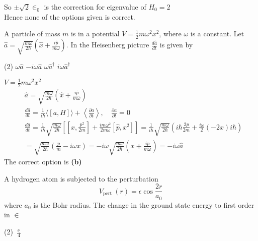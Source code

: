 \begin{enumerate}
\begin{answer}
	So $\pm \sqrt{2} \in_{0}$ is the correction for eigenvalue of $H_{0}=2$\\
	Hence none of the options given is correct.	
\end{answer}
\begin{minipage}{\textwidth}
	\item A particle of mass $m$ is in a potential $V=\frac{1}{2} m \omega^{2} x^{2}$, where $\omega$ is a constant. Let $\hat{a}=\sqrt{\frac{m \omega}{2 \hbar}}\left(\hat{x}+\frac{i \hat{p}}{m \omega}\right) .$ In the Heisenberg picture $\frac{d \hat{a}}{d t}$ is given by
\end{minipage}
\begin{tasks}(2)
	\task[\textbf{A.}] $\omega \hat{a}$
	\task[\textbf{B.}]$-i \omega \hat{a}$
	\task[\textbf{C.}]$\omega \hat{a}^{\dagger}$
	\task[\textbf{D.}]$i \omega \hat{a}^{\dagger}$
\end{tasks}
\begin{answer}
	$V=\frac{1}{2} m \omega^{2} x^{2}$\\
	$$\begin{aligned}
	&\hat{a}=\sqrt{\frac{m \omega}{2 \hbar}}\left(\hat{x}+\frac{i \hat{p}}{m \omega}\right) \\
	&\frac{d \hat{a}}{d t}=\frac{1}{i \hbar}\langle[a, H]\rangle+\left\langle\frac{\partial a}{\partial t}\right\rangle, \quad \frac{\partial a}{\partial t}=0 \\
	&\frac{d \hat{a}}{d t}=\frac{1}{i \hbar} \sqrt{\frac{m \omega}{2 \hbar}}\left[\left[x, \frac{p^{2}}{2 m}\right]+\frac{i m \omega^{2}}{2 m \omega}\left[\hat{p}, x^{2}\right]\right]=\frac{1}{i \hbar} \sqrt{\frac{m \omega}{2 \hbar}}\left(i \hbar \frac{2 p}{2 m}+\frac{i \omega}{2}(-2 x) i \hbar\right) \\
	&=\sqrt{\frac{m \omega}{2 \hbar}}\left(\frac{p}{m}-i \omega x\right)=-i \omega \sqrt{\frac{m \omega}{2 \hbar}}\left(x+\frac{i p}{m \omega}\right)=-i \omega \hat{a}
	\end{aligned}$$
	The correct option is \textbf{(b)}
\end{answer}
\begin{minipage}{\textwidth}
	\item A hydrogen atom is subjected to the perturbation
	$$
	V_{\text {pert }}(r)=\epsilon \cos \frac{2 r}{a_{0}}
	$$
	where $a_{0}$ is the Bohr radius. The change in the ground state energy to first order in $\in$
\end{minipage}
\begin{tasks}(2)
	\task[\textbf{A.}] $\frac{\in}{4}$

\end{tasks}
\end{enumerate}
